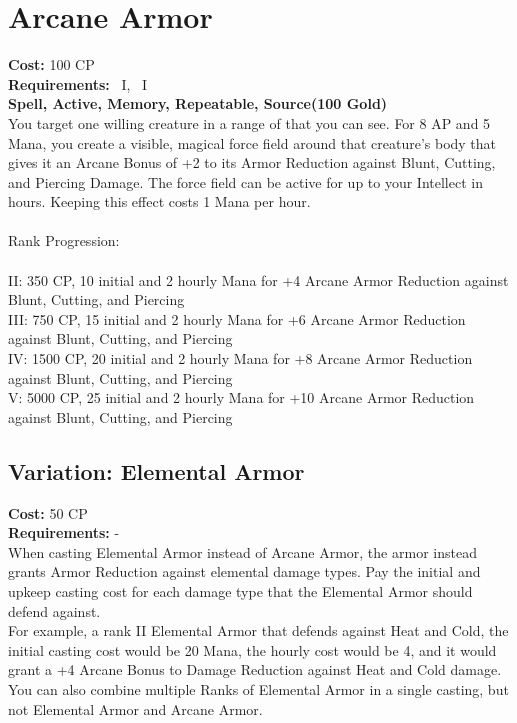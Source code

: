 \section{Arcane Armor}\label{spell:arcaneArmor}
\textbf{Cost:} 100 CP\\
\textbf{Requirements:}~ I,~ I\\
\textbf{Spell, Active, Memory, Repeatable, Source(100 Gold)}\\
You target one willing creature in a range of  that you can see.
For 8 AP and 5 Mana, you create a visible, magical force field around that creature's body that gives it an Arcane Bonus of +2 to its Armor Reduction against Blunt, Cutting, and Piercing Damage.
The force field can be active for up to your Intellect in hours.
Keeping this effect costs 1 Mana per hour.\\
\\
Rank Progression:\\
\\
II: 350 CP, 10 initial and 2 hourly Mana for +4 Arcane Armor Reduction against Blunt, Cutting, and Piercing\\
III: 750 CP, 15 initial and 2 hourly Mana for +6 Arcane Armor Reduction against Blunt, Cutting, and Piercing\\
IV: 1500 CP, 20 initial and 2 hourly Mana for +8 Arcane Armor Reduction against Blunt, Cutting, and Piercing\\
V: 5000 CP, 25 initial and 2 hourly Mana for +10 Arcane Armor Reduction against Blunt, Cutting, and Piercing\\

\subsection{Variation: Elemental Armor}\label{spell:elementalArmor}
\textbf{Cost:} 50 CP\\
\textbf{Requirements:} -\\
When casting Elemental Armor instead of Arcane Armor, the armor instead grants Armor Reduction against elemental damage types.
Pay the initial and upkeep casting cost for each damage type that the Elemental Armor should defend against.\\
For example, a rank II Elemental Armor that defends against Heat and Cold, the initial casting cost would be 20 Mana, the hourly cost would be 4, and it would grant a +4 Arcane Bonus to Damage Reduction against Heat and Cold damage.\\
You can also combine multiple Ranks of Elemental Armor in a single casting, but not Elemental Armor and Arcane Armor.\\